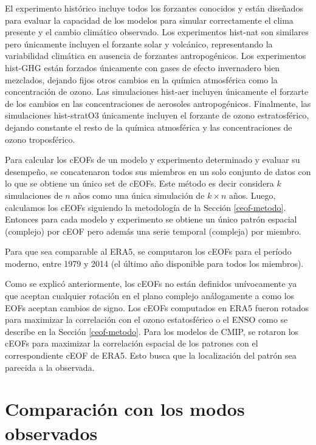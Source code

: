 \documentclass[12pt,oneside,a4paper]{reedthesis}
\begin{document}
El experimento histórico incluye todos los forzantes conocidos y están diseñados para evaluar la capacidad de los modelos para simular correctamente el clima presente y el cambio climático observado.
Los experimentos hist-nat son similares pero únicamente incluyen el forzante solar y volcánico, representando la variabilidad climática en ausencia de forzantes antropogénicos.
Los experimentos hist-GHG están forzados únicamente con gases de efecto invernadero bien mezclados, dejando fijos otros cambios en la química atmosférica como la concentración de ozono.
Las simulaciones hist-aer incluyen únicamente el forzarte de los cambios en las concentraciones de aerosoles antropogénicos.
Finalmente, las simulaciones hist-stratO3 únicamente incluyen el forzante de ozono estratosférico, dejando constante el resto de la química atmosférica y las concentraciones de ozono troposférico.

Para calcular los cEOFs de un modelo y experimento determinado y evaluar su desempeño, se concatenaron todos sus miembros en un solo conjunto de datos con lo que se obtiene un único set de cEOFs.
Este método es decir considera \(k\) simulaciones de \(n\) años como una única simulación de \(k\times n\) años.
Luego, calculamos los cEOFs siguiendo la metodología de la Sección \ref{ceof-metodo}.
Entonces para cada modelo y experimento se obtiene un único patrón espacial (complejo) por cEOF pero además una serie temporal (compleja) por miembro.

Para que sea comparable al ERA5, se computaron los cEOFs para el período moderno, entre 1979 y 2014 (el último año disponible para todos los miembros).

Como se explicó anteriormente, los cEOFs no están definidos unívocamente ya que aceptan cualquier rotación en el plano complejo análogamente a como los EOFs aceptan cambios de signo.
Los cEOFs computados en ERA5 fueron rotados para maximizar la correlación con el ozono estatosférico o el ENSO como se describe en la Sección \ref{ceof-metodo}.
Para los modelos de CMIP, se rotaron los cEOFs para maximizar la correlación espacial de los patrones con el correspondiente cEOF de ERA5.
Esto busca que la localización del patrón sea parecida a la observada.

\hypertarget{comparaciuxf3n-con-los-modos-observados}{%
\section{Comparación con los modos observados}\label{comparaciuxf3n-con-los-modos-observados}}
\end{document}

